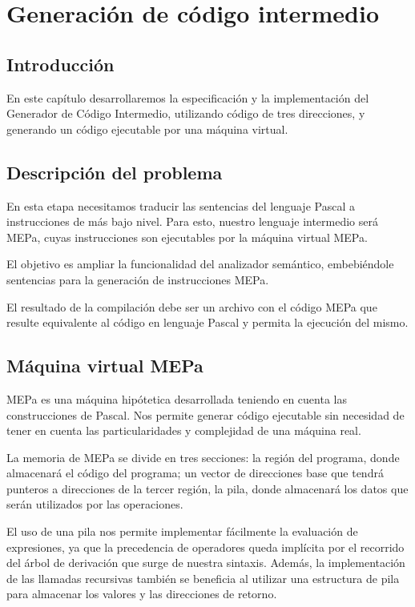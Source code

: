\chapter{Generación de código intermedio}

\section{Introducción}
En este capítulo desarrollaremos la especificación y la implementación del Generador de Código Intermedio, utilizando código de tres direcciones, y generando un código ejecutable por una máquina virtual.

\section{Descripción del problema}
\label{sec:gen_cod:descr_prob}
En esta etapa necesitamos traducir las sentencias del lenguaje Pascal a instrucciones de más bajo nivel. Para esto, nuestro lenguaje intermedio será MEPa, cuyas instrucciones son ejecutables por la máquina virtual MEPa. 

El objetivo es ampliar la funcionalidad del analizador semántico, embebiéndole sentencias para la generación de instrucciones MEPa.

El resultado de la compilación debe ser un archivo con el código MEPa que resulte equivalente al código en lenguaje Pascal y permita la ejecución del mismo.

\section{Máquina virtual MEPa}
MEPa es una máquina hipótetica desarrollada teniendo en cuenta las construcciones de Pascal. Nos permite generar código ejecutable sin necesidad de tener en cuenta las particularidades y complejidad de una máquina real.

La memoria de MEPa se divide en tres secciones: la región del programa, donde almacenará el código del programa; un vector de direcciones base que tendrá punteros a direcciones de la tercer región, la pila, donde almacenará los datos que serán utilizados por las operaciones. 

El uso de una pila nos permite implementar fácilmente la evaluación de expresiones, ya que la precedencia de operadores queda implícita por el recorrido del árbol de derivación que surge de nuestra sintaxis. Además, la implementación de las llamadas recursivas también se beneficia al utilizar una estructura de pila para almacenar los valores y las direcciones de retorno.

